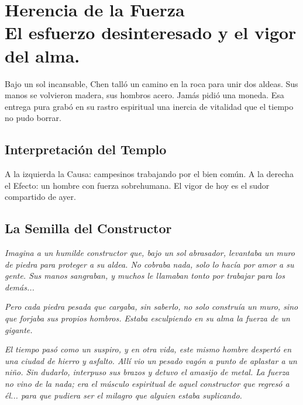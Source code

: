 \chapter[Herencia de la Fuerza]{Herencia de la Fuerza\\ \large El esfuerzo desinteresado y el vigor del alma.}


\lettrine[lines=3, nindent=0.5em, findent=0.2em]{B}{}ajo un sol incansable, Chen talló un camino en la roca para unir dos aldeas. Sus manos se volvieron madera, sus hombros acero. Jamás pidió una moneda. Esa entrega pura grabó en su rastro espiritual una inercia de vitalidad que el tiempo no pudo borrar.

\section{Interpretación del Templo}
A la izquierda la Causa: campesinos trabajando por el bien común. A la derecha el Efecto: un hombre con fuerza sobrehumana. El vigor de hoy es el sudor compartido de ayer.

\section{La Semilla del Constructor}
\begin{elegantquote}
\textit{Imagina a un humilde constructor que, bajo un sol abrasador, levantaba un muro de piedra para proteger a su aldea. No cobraba nada, solo lo hacía por amor a su gente. Sus manos sangraban, y muchos le llamaban tonto por trabajar para los demás...}

\textit{Pero cada piedra pesada que cargaba, sin saberlo, no solo construía un muro, sino que forjaba sus propios hombros. Estaba esculpiendo en su alma la fuerza de un gigante.}

\textit{El tiempo pasó como un suspiro, y en otra vida, este mismo hombre despertó en una ciudad de hierro y asfalto. Allí vio un pesado vagón a punto de aplastar a un niño. Sin dudarlo, interpuso sus brazos y detuvo el amasijo de metal. La fuerza no vino de la nada; era el músculo espiritual de aquel constructor que regresó a él... para que pudiera ser el milagro que alguien estaba suplicando.}

\end{elegantquote}


